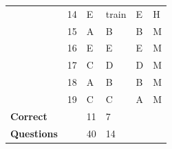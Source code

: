 \documentclass[pageno]{final_paper}
\begin{document}
\begin{table}[]
\begin{tabular}{llllll}
\textbf{}                & 14                                  & E                                          & train                                       & E                                           & H                                       \\
\textbf{}                & 15                                  & A                                          & B                                           & B                                           & M                                       \\
\textbf{}                & 16                                  & E                                          & E                                           & E                                           & M                                       \\
\textbf{}                & 17                                  & C                                          & D                                           & D                                           & M                                       \\
\textbf{}                & 18                                  & A                                          & B                                           & B                                           & M                                       \\
\textbf{}                & 19                                  & C                                          & C                                           & A                                           & M                                       \\ \midrule
\textbf{Correct}         &                                     & 11                                         & 7                                           &                                             &                                         \\
\textbf{Questions}       &                                     & 40                                         & 14                                          &                                             &                                         \\ \bottomrule
\end{tabular}
\end{table}
\end{document}
